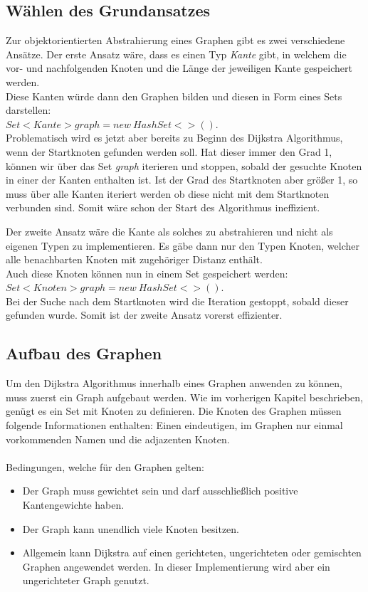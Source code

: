 \documentclass[a4paper]{article}
\begin{document}
\subsection{Wählen des Grundansatzes}

Zur objektorientierten Abstrahierung eines Graphen gibt es zwei verschiedene Ansätze. Der erste Ansatz wäre, dass es einen Typ \textit{Kante} gibt, in welchem die vor- und nachfolgenden Knoten und die Länge der jeweiligen Kante gespeichert werden.\\
Diese Kanten würde dann den Graphen bilden und diesen in Form eines Sets darstellen:\\$Set <Kante> graph = new\ HashSet<>()$.\\
Problematisch wird es jetzt aber bereits zu Beginn des Dijkstra Algorithmus, wenn der Startknoten gefunden werden soll. Hat dieser immer den Grad 1, können wir über das Set \textit{graph} iterieren und stoppen, sobald der gesuchte Knoten in einer der Kanten enthalten ist. Ist der Grad des Startknoten aber größer 1, so muss über alle Kanten iteriert werden ob diese nicht mit dem Startknoten verbunden sind. Somit wäre schon der Start des Algorithmus ineffizient.

Der zweite Ansatz wäre die Kante als solches zu abstrahieren und nicht als eigenen Typen zu implementieren. Es gäbe dann nur den Typen Knoten, welcher alle benachbarten Knoten mit zugehöriger Distanz enthält.\\
Auch diese Knoten können nun in einem Set gespeichert werden:\\
$Set<Knoten> graph = new\ HashSet<>()$.\\
Bei der Suche nach dem Startknoten wird die Iteration gestoppt, sobald dieser gefunden wurde.
Somit ist der zweite Ansatz vorerst effizienter.

\subsection{Aufbau des Graphen}

Um den Dijkstra Algorithmus innerhalb eines Graphen anwenden zu können, muss zuerst ein Graph aufgebaut werden.
Wie im vorherigen Kapitel beschrieben, genügt es ein Set mit Knoten zu definieren.
Die Knoten des Graphen müssen folgende Informationen enthalten: Einen eindeutigen, im Graphen nur einmal vorkommenden Namen und die adjazenten Knoten.\\\\
Bedingungen, welche für den Graphen gelten:
\begin{itemize}
    \item Der Graph muss gewichtet sein und darf ausschließlich positive Kantengewichte haben.
    \item Der Graph kann unendlich viele Knoten besitzen.
    \item Allgemein kann Dijkstra auf einen gerichteten, ungerichteten oder gemischten Graphen angewendet werden. In dieser Implementierung wird aber ein ungerichteter Graph genutzt.
\end{itemize}
\end{document}

